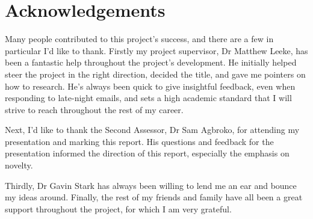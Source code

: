 \section*{Acknowledgements}

\vspace{2cm}

\large

Many people contributed to this project's success, and there are a few in particular I'd like to thank.
Firstly my project supervisor, Dr Matthew Leeke, has been a fantastic help throughout the project's development.
He initially helped steer the project in the right direction, decided the title, and gave me pointers on how to research.
He's always been quick to give insightful feedback, even when responding to late-night emails, and sets a high academic standard that I will strive to reach throughout the rest of my career.

Next, I'd like to thank the Second Assessor, Dr Sam Agbroko, for attending my presentation and marking this report.
His questions and feedback for the presentation informed the direction of this report, especially the emphasis on novelty.

Thirdly, Dr Gavin Stark has always been willing to lend me an ear and bounce my ideas around.
Finally, the rest of my friends and family have all been a great support throughout the project, for which I am very grateful.
